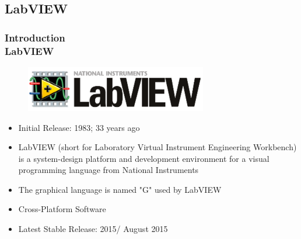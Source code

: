 \documentclass[hyperref={pdfpagelabels=true}]{beamer}
\begin{document}
\subsection{LabVIEW}
\begin{frame}
\frametitle{Introduction\\ {\large LabVIEW}}
\begin{figure}[!tbp]
\centering
\includegraphics[scale = 0.5]{figs/fg.png}
\end{figure}
\begin{itemize}
\item Initial Release: 1983; 33 years ago
\item LabVIEW (short for Laboratory Virtual Instrument Engineering Workbench) is a system-design platform and development environment for a visual programming language from National Instruments
\item The graphical language is named "G" used by LabVIEW
\item Cross-Platform Software
\item Latest Stable Release: 2015/ August 2015
\end{itemize}
\end{frame}








\end{document}
